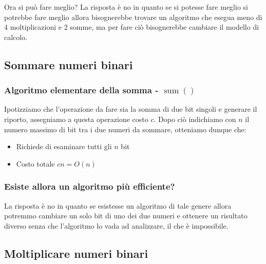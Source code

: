             Ora si può fare meglio? La risposta è no in quanto se si potesse fare meglio si potrebbe fare meglio allora bisognerebbe trovare un algoritmo che esegua meno di 4 moltiplicazioni e 2 somme, ma per fare ciò bisognerebbe cambiare il modello di calcolo.
    \subsection{Sommare numeri binari}
        \subsubsection{Algoritmo elementare della somma - $ \operatorname{sum}() $}
            Ipotizziamo che l'operazione da fare sia la somma di due bit singoli e generare il riporto, assegniamo a questa operazione costo $ c $.
            Dopo ciò indichiamo con $ n $ il numero massimo di bit tra i due numeri da sommare, otteniamo dunque che:
            \begin{itemize}
                \item Richiede di esaminare tutti gli $ n $ bit
                \item Costo totale $ cn = O(n) $
            \end{itemize}
        \subsubsection{Esiste allora un algoritmo più efficiente?}
            La risposta è no in quanto se esistesse un algoritmo di tale genere allora potremmo cambiare un solo bit di uno dei due numeri e ottenere un risultato diverso senza che l'algoritmo lo vada ad analizzare, il che è impossibile.
    \subsection{Moltiplicare numeri binari}
